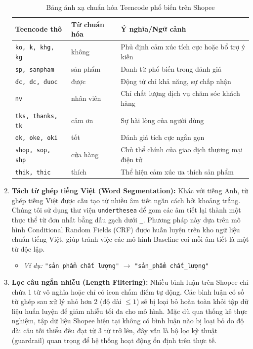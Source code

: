 \documentclass[12pt,a4paper]{article}
\begin{document}
\begin{enumerate}
    \begin{table}[H]
        \centering
        \begin{tabular}{llp{7cm}}
            \toprule
            \textbf{Teencode thô} & \textbf{Từ chuẩn hóa} & \textbf{Ý nghĩa/Ngữ cảnh} \\
            \midrule
            \texttt{ko, k, khg, kg} & không & Phủ định cảm xúc tích cực hoặc bổ trợ ý kiến \\
            \texttt{sp, sanpham} & sản phẩm & Danh từ phổ biến trong đánh giá \\
            \texttt{đc, dc, đuoc} & được & Động từ chỉ khả năng, sự chấp nhận \\
            \texttt{nv} & nhân viên & Chỉ chất lượng dịch vụ chăm sóc khách hàng \\
            \texttt{tks, thanks, tk} & cảm ơn & Sự hài lòng của người dùng \\
            \texttt{ok, oke, oki} & tốt & Đánh giá tích cực ngắn gọn \\
            \texttt{shop, sop, shp} & cửa hàng & Chủ thể chính của giao dịch thương mại điện tử \\
            \texttt{thik, thic} & thích & Thể hiện cảm xúc ưa thích sản phẩm \\
            \bottomrule
        \end{tabular}
        \caption{Bảng ánh xạ chuẩn hóa Teencode phổ biến trên Shopee}
        \label{tab:teencode_map}
    \end{table}
    
    \item \textbf{Tách từ ghép tiếng Việt (Word Segmentation):}
    Khác với tiếng Anh, từ ghép tiếng Việt được cấu tạo từ nhiều âm tiết ngăn cách bởi khoảng trắng. Chúng tôi sử dụng thư viện \texttt{underthesea} để gom các âm tiết lại thành một thực thể từ đơn nhất bằng dấu gạch dưới \texttt{\_}. Phương pháp này dựa trên mô hình Conditional Random Fields (CRF) được huấn luyện trên kho ngữ liệu chuẩn tiếng Việt, giúp tránh việc các mô hình Baseline coi mỗi âm tiết là một từ độc lập.
    \begin{itemize}
        \item \textit{Ví dụ:} \texttt{"sản phẩm chất lượng"} $\rightarrow$ \texttt{"sản\_phẩm chất\_lượng"}
    \end{itemize}
    
    \item \textbf{Lọc câu ngắn nhiễu (Length Filtering):}
    Nhiều bình luận trên Shopee chỉ chứa 1 từ vô nghĩa hoặc chỉ có icon chấm điểm tự động. Các bình luận có số từ ghép sau xử lý nhỏ hơn 2 (độ dài $\le 1$) sẽ bị loại bỏ hoàn toàn khỏi tập dữ liệu huấn luyện để giảm nhiễu tối đa cho mô hình. Mặc dù qua thống kê thực nghiệm, tập dữ liệu Shopee hiện tại không có bình luận nào bị loại bỏ do độ dài câu tối thiểu đều đạt từ 3 từ trở lên, đây vẫn là bộ lọc kỹ thuật (guardrail) quan trọng để hệ thống hoạt động ổn định trên thực tế.
\end{enumerate}
\end{document}
